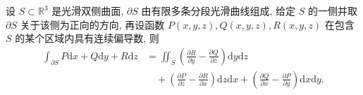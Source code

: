 \documentclass[12pt,fontset=fandol]{ctexart}
\begin{document}
\begin{theorem}[斯托克斯公式]\label{course-theorem-16-5-3}\quad 设 $S\subset\mathbb R^3$ 是光滑双侧曲面, $\partial S$ 由有限多条分段光滑曲线组成, 给定 $S$ 的一侧并取 $\partial S$ 关于该侧为正向的方向, 再设函数 $P(x,y,z),Q(x,y,z),R(x,y,z)$ 在包含 $S$ 的某个区域内具有连续偏导数, 则
\[
\begin{aligned}
  \int_{\partial S}P\mathrm dx+Q\mathrm dy+R\mathrm dz
  &=\iint_S\left(\frac{\partial R}{\partial y}-\frac{\partial Q}{\partial z}\right)\mathrm dy\mathrm dz\\
  &\quad+\left(\frac{\partial P}{\partial z}-\frac{\partial R}{\partial x}\right)\mathrm dz\mathrm dx
    +\left(\frac{\partial Q}{\partial x}-\frac{\partial P}{\partial y}\right)\mathrm dx\mathrm dy.
\end{aligned}
\]

\end{theorem}
\end{document}
